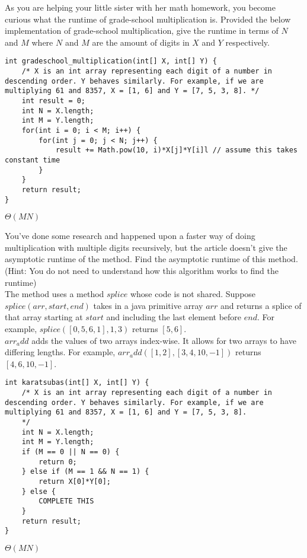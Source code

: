 \question As you are helping your little sister with her math homework, you become curious what the runtime of grade-school multiplication is. Provided the below implementation of grade-school multiplication, give the runtime in terms of $N$ and $M$ where $N$ and $M$ are the amount of digits in $X$ and $Y$ respectively. 

\begin{lstlisting}
int gradeschool_multiplication(int[] X, int[] Y) {
    /* X is an int array representing each digit of a number in descending order. Y behaves similarly. For example, if we are multiplying 61 and 8357, X = [1, 6] and Y = [7, 5, 3, 8]. */
    int result = 0;
    int N = X.length;
    int M = Y.length;
    for(int i = 0; i < M; i++) {
        for(int j = 0; j < N; j++) {
            result += Math.pow(10, i)*X[j]*Y[i]l // assume this takes constant time
        }
    }
    return result;
}
\end{lstlisting}

\begin{solution}[1in]
$\Theta(MN)$
\end{solution}

\question You've done some research and happened upon a faster way of doing multiplication with multiple digits recursively, but the article doesn't give the asymptotic runtime of the method. Find the asymptotic runtime of this method. (Hint: You do not need to understand how this algorithm works to find the runtime)\\

The method uses a method $splice$ whose code is not shared. Suppose $splice(arr, start, end)$ takes in a java primitive array $arr$ and returns a splice of that array starting at $start$ and including the last element before $end$. For example, $splice([0, 5, 6, 1], 1, 3)$ returns $[5, 6]$. \\

$arr_add$ adds the values of two arrays index-wise. It allows for two arrays to have differing lengths. For example, $arr_add([1, 2], [3, 4, 10, -1])$ returns $[4, 6, 10, -1]$. 

\begin{lstlisting}
int karatsubas(int[] X, int[] Y) {
    /* X is an int array representing each digit of a number in descending order. Y behaves similarly. For example, if we are multiplying 61 and 8357, X = [1, 6] and Y = [7, 5, 3, 8]. 
    */
    int N = X.length;
    int M = Y.length;
    if (M == 0 || N == 0) {
        return 0;
    } else if (M == 1 && N == 1) {
        return X[0]*Y[0];
    } else {
        COMPLETE THIS
    }
    return result;
}
\end{lstlisting}

\begin{solution}[1in]
$\Theta(MN)$
\end{solution}